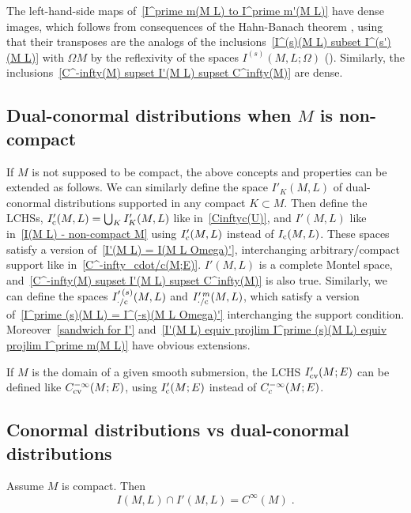 \documentclass{memo-l}
\theoremstyle{plain}
\theoremstyle{definition}
\theoremstyle{remark}
\newcommand{\co}{{\text{\rm c}}}
\newcommand{\cv}{{\text{\rm cv}}}
\numberwithin{section}{chapter}
\numberwithin{equation}{section}%
\begin{document}
The left-hand-side maps of~\eqref{I^prime m(M L) to I^prime m'(M L)} have dense images, which follows from consequences of the Hahn-Banach theorem \cite[Theorems~7.7.5 and~7.7.7~(c)]{NariciBeckenstein2011}, using that their transposes are the analogs of the inclusions~\eqref{I^(s)(M L) subset I^(s')(M L)} with $\Omega M$ by the reflexivity of the spaces $I^{(s)}(M,L;\Omega)$ (). Similarly, the inclusions~\eqref{C^-infty(M) supset I'(M L) supset C^infty(M)} are dense.


\subsection{Dual-conormal distributions when $M$ is non-compact}\label{ss: dual-conormal distribs - non-compact}

If $M$ is not supposed to be compact, the above concepts and properties can be extended as follows. We can similarly define the space $I'_K(M,L)$ of dual-conormal distributions supported in any compact $K\subset M$. Then define the LCHSs, $I'_\co(M,L)=\bigcup_KI'_K(M,L)$ like in~\eqref{Cinftyc(U)}, and $I'(M,L)$ like in~\eqref{I(M L) - non-compact M} using $I'_\co(M,L)$ instead of $I_\co(M,L)$. These spaces satisfy a version of~\eqref{I'(M L) = I(M L Omega)'}, interchanging arbitrary/compact support like in~\eqref{C^-infty_cdot/c(M;E)}. $I'(M,L)$ is a complete Montel space, and~\eqref{C^-infty(M) supset I'(M L) supset C^infty(M)} is also true. Similarly, we can define the spaces $I^{\prime\,(s)}_{{\cdot}/\co}(M,L)$ and $I^{\prime\,m}_{{\cdot}/\co}(M,L)$, \index{$I^{\prime\,m}_{{\cdot}/\co}(M,L)$} which satisfy a version of~\eqref{I^prime (s)(M L) = I^(-s)(M L Omega)'} interchanging the support condition. Moreover~\eqref{sandwich for I'} and~\eqref{I'(M L) equiv projlim I^prime (s)(M L) equiv projlim I^prime m(M L)} have obvious extensions. 

If $M$ is the domain of a given smooth submersion, the LCHS $I'_\cv(M;E)$ can be defined like $C^{-\infty}_\cv(M;E)$, using $I'_\co(M;E)$ instead of $C^{-\infty}_\co(M;E)$. \index{$I_\cv(M;E)$}


\subsection{Conormal distributions vs dual-conormal distributions}\label{ss: conormal distribs vs dual-conormal distribs}

Assume $M$ is compact. Then \cite[Theorem~8.11]{AlvKordyLeichtnam-conormal}
\[
I(M,L)\cap I'(M,L)=C^\infty(M)\;.
\]
\end{document}
